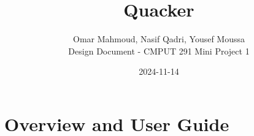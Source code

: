 \documentclass[12pt]{article}
\begin{document}
\title{\huge Quacker}
\author{Omar Mahmoud,  Nasif Qadri,  Yousef Moussa\\[0.5cm] 
Design Document - CMPUT 291 Mini Project 1\\}
\date{2024-11-14}

\maketitle
\newpage


\section{Overview and User Guide}
\end{document}

